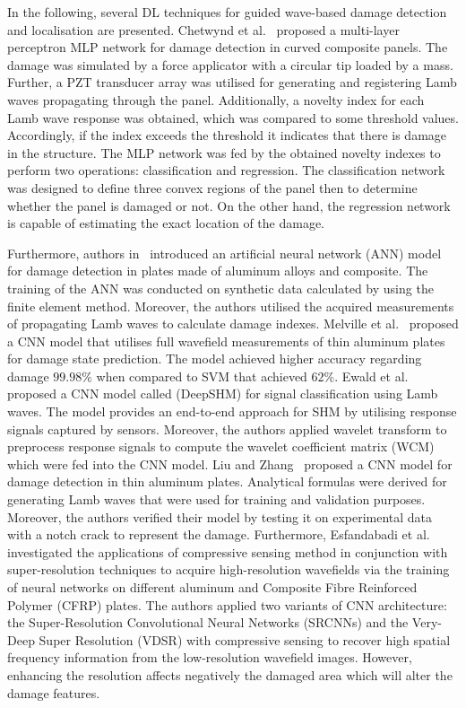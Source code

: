 In the following, several DL techniques for guided wave-based damage detection and localisation are presented.
Chetwynd et al.~\cite{Chetwynd2008} proposed a multi-layer perceptron MLP network for damage detection in curved composite panels.
The damage was simulated by a force applicator with a circular tip loaded by a mass.
Further, a PZT transducer array was utilised for generating and registering Lamb waves propagating through the panel.
Additionally, a novelty index for each Lamb wave response was obtained,
which was compared to some threshold values. 
Accordingly, if the index exceeds the threshold it indicates that there is damage in the structure. 
The MLP network was fed by the obtained novelty indexes to perform two operations: classification and regression. 
The classification network was designed to define three convex regions of the panel then to determine whether the panel is damaged or not. 
On the other hand, the regression network is capable of estimating the exact location of the damage.

Furthermore, authors in~\cite{DeFenza2015} introduced an artificial neural network (ANN) model for damage detection in plates made of aluminum alloys and composite.
The training of the ANN was conducted on synthetic data calculated by using the finite element method.
Moreover, the authors utilised the acquired measurements of propagating Lamb waves to calculate damage indexes.
Melville et al.~\cite{Melville2018} proposed a CNN model that utilises full wavefield measurements of thin aluminum plates for damage state prediction.
The model achieved higher accuracy regarding damage \(99.98\%\) when compared to SVM that achieved \(62\%\).
Ewald et al.~\cite{Ewald2019} proposed a CNN model called (DeepSHM) for signal classification using Lamb waves.
The model provides an end-to-end approach for SHM by utilising response signals captured by sensors.
Moreover, the authors applied wavelet transform to preprocess response signals to compute the wavelet coefficient matrix (WCM) which were fed into the CNN model.
Liu and Zhang~\cite{Liu2020a} proposed a CNN model for damage detection in thin aluminum plates.
Analytical formulas were derived for generating Lamb waves that were used for training and validation purposes.
Moreover, the authors verified their model by testing it on experimental data with a notch crack to represent the damage.
Furthermore, Esfandabadi et al.~\cite{esfandabadideep} investigated the applications of compressive sensing method in conjunction with super-resolution techniques to acquire high-resolution wavefields via the training of neural networks on different aluminum and Composite Fibre Reinforced Polymer (CFRP) plates. 
The authors applied two variants of CNN architecture:  the Super-Resolution Convolutional Neural Networks (SRCNNs) and the Very-Deep Super Resolution (VDSR) with compressive sensing to recover high spatial frequency information from the low-resolution wavefield images.
However, enhancing the resolution affects negatively the damaged area which will alter the damage features.

